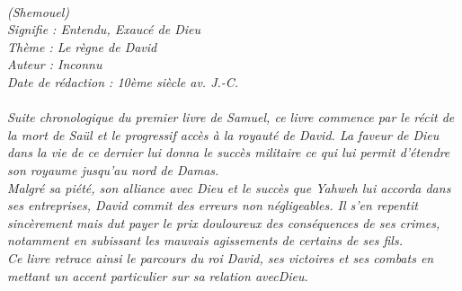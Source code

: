 \BFont
\noindent\hrulefill
{\footnotesize
\textit{
\bigskip
{\centering{}
\\(Shemouel)
\\Signifie : Entendu, Exaucé de Dieu
\\Thème : Le règne de David
\\Auteur : Inconnu
\\Date de rédaction : 10ème siècle av. J.-C.\\}
}
\textit{
\\Suite chronologique du premier livre de Samuel, ce livre commence par le récit de la mort de Saül et le progressif accès à la royauté de David. La faveur de Dieu dans la vie de ce dernier lui donna le succès militaire ce qui lui permit d’étendre son royaume jusqu’au nord de Damas.
\\Malgré sa piété, son alliance avec Dieu et le succès que Yahweh lui accorda dans ses entreprises, David commit des erreurs non négligeables. Il s’en repentit sincèrement mais dut payer le prix douloureux des conséquences de ses crimes,  notamment en subissant les mauvais agissements de certains de ses fils. 
\\Ce livre retrace ainsi le parcours du roi David, ses victoires et ses combats en mettant un accent particulier sur sa relation avecDieu.\bigskip
}
}
\par\nobreak\noindent\hrulefill
